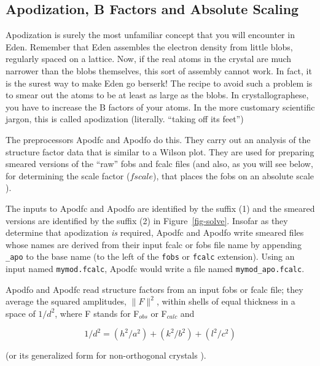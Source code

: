 \documentclass{report}
\begin{document}
\subsection {Apodization, B Factors and Absolute Scaling}
\label{solver-preparation-apod}

Apodization is surely the most unfamiliar concept that you will encounter
in Eden.  Remember that Eden assembles the electron density from little blobs,
regularly spaced on a lattice.  Now, if the real atoms in the crystal are much 
narrower than the blobs themselves, this sort of assembly cannot work.
In fact, it is the surest way to make Eden go berserk!  The recipe to avoid
such a problem is to smear out the atoms to be at least as large as the blobs.
In crystallographese, you have to increase the B factors of your atoms.  In
the more customary scientific jargon, this is called apodization (literally. 
``taking off its feet'')

\vspace {0.1in}

The preprocessors Apodfc and Apodfo do this.  They carry out an analysis of 
the structure factor data that is similar to a Wilson plot.  
They are used for preparing smeared versions of the ``raw'' fobs and fcalc 
files (and also, as you will see below, for determining the scale factor 
($fscale$), that places the fobs on an absolute scale ).

The inputs to Apodfc and Apodfo are identified by the suffix (1) and
the smeared versions are identified by the suffix (2) in Figure~\ref{fig-solve}.
Insofar as they determine that apodization {\em is} required,
Apodfc and Apodfo write smeared files whose names are derived 
from their input fcalc or fobs file name by appending {\tt \_apo} to the base
name (to the left of the {\tt fobs} or {\tt fcalc} extension).  
Using an input named {\tt mymod.fcalc}, Apodfc would write a file named 
{\tt mymod\_apo.fcalc}.

\vspace {0.1in}

Apodfo and Apodfc read structure factors from an input fobs
or fcalc file; they average the squared amplitudes, $\|F\|^2$, within
shells of equal thickness in a space
of $1/d^2$, where F stands for F$_{obs}$ or F$_{calc}$ and 

$$ 1/d^2 = (h^2/a^2) + (k^2/b^2) + (l^2/c^2) $$

(or its generalized form for non-orthogonal crystals \cite{glusker}).  

\vspace {0.1in}
\end{document}
